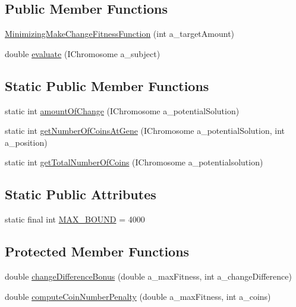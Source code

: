 \subsection*{Public Member Functions}
\begin{DoxyCompactItemize}
\item 
\hyperlink{classexamples_1_1_minimizing_make_change_fitness_function_ae473a0dc2c5666ce9c3393934ca5e6e5}{Minimizing\-Make\-Change\-Fitness\-Function} (int a\-\_\-target\-Amount)
\item 
double \hyperlink{classexamples_1_1_minimizing_make_change_fitness_function_a958db87eb0a67c86bd0fcd842aeb2c0b}{evaluate} (I\-Chromosome a\-\_\-subject)
\end{DoxyCompactItemize}
\subsection*{Static Public Member Functions}
\begin{DoxyCompactItemize}
\item 
static int \hyperlink{classexamples_1_1_minimizing_make_change_fitness_function_ab2dd3b7e943920f21b1405fc11707d9e}{amount\-Of\-Change} (I\-Chromosome a\-\_\-potential\-Solution)
\item 
static int \hyperlink{classexamples_1_1_minimizing_make_change_fitness_function_a43cbaf67a6ca5437a81bc8b33ab702e7}{get\-Number\-Of\-Coins\-At\-Gene} (I\-Chromosome a\-\_\-potential\-Solution, int a\-\_\-position)
\item 
static int \hyperlink{classexamples_1_1_minimizing_make_change_fitness_function_a55b53d2df29ad9237ca717450dba5af8}{get\-Total\-Number\-Of\-Coins} (I\-Chromosome a\-\_\-potentialsolution)
\end{DoxyCompactItemize}
\subsection*{Static Public Attributes}
\begin{DoxyCompactItemize}
\item 
static final int \hyperlink{classexamples_1_1_minimizing_make_change_fitness_function_ace5118d4c00bde2d1c191322a46ceefb}{M\-A\-X\-\_\-\-B\-O\-U\-N\-D} = 4000
\end{DoxyCompactItemize}
\subsection*{Protected Member Functions}
\begin{DoxyCompactItemize}
\item 
double \hyperlink{classexamples_1_1_minimizing_make_change_fitness_function_aecd320137a3e296858dd040d0de9ba06}{change\-Difference\-Bonus} (double a\-\_\-max\-Fitness, int a\-\_\-change\-Difference)
\item 
double \hyperlink{classexamples_1_1_minimizing_make_change_fitness_function_a812d826a7cb5a9c95460bc35435c0808}{compute\-Coin\-Number\-Penalty} (double a\-\_\-max\-Fitness, int a\-\_\-coins)
\end{DoxyCompactItemize}
